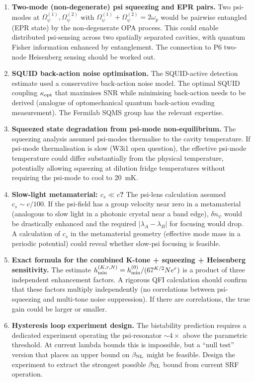 \documentclass[11pt,twocolumn]{article}
\newcommand{\lam}{\lambda}
\newcommand{\Opsi}{\Omega_\psi}
\begin{document}
\begin{enumerate}

\item \textbf{Two-mode (non-degenerate) psi squeezing and EPR pairs.}
Two psi-modes at $\Opsi^{(1)}, \Opsi^{(2)}$ with $\Opsi^{(1)} +
\Opsi^{(2)} = 2\omega_p$ would be pairwise entangled (EPR state)
by the non-degenerate OPA process. This could enable distributed
psi-sensing across two spatially separated cavities, with quantum
Fisher information enhanced by entanglement. The connection to P6
two-node Heisenberg sensing should be worked out.

\item \textbf{SQUID back-action noise optimisation.}
The SQUID-active detection estimate used a conservative back-action
noise model. The optimal SQUID coupling $\kappa_{\rm opt}$ that
maximises SNR while minimising back-action needs to be derived
(analogue of optomechanical quantum back-action evading measurement).
The Fermilab SQMS group has the relevant expertise.

\item \textbf{Squeezed state degradation from psi-mode non-equilibrium.}
The squeezing analysis assumed psi-modes thermalise to the cavity
temperature. If psi-mode thermalisation is slow (W3i1 open question),
the effective psi-mode temperature could differ substantially from
the physical temperature, potentially allowing squeezing at
dilution fridge temperatures without requiring the psi-mode to cool
to 20~mK.

\item \textbf{Slow-light metamaterial: $c_s \ll c$?}
The psi-lens calculation assumed $c_s \sim c/100$. If the psi-field
has a group velocity near zero in a metamaterial (analogous to slow
light in a photonic crystal near a band edge), $\delta n_\psi$ would
be drastically enhanced and the required $|\lam_A - \lam_B|$ for
focusing would drop. A calculation of $c_s$ in the metamaterial
geometry (effective mode mass in a periodic potential) could reveal
whether slow-psi focusing is feasible.

\item \textbf{Exact formula for the combined K-tone + squeezing + Heisenberg sensitivity.}
The estimate $h_{\rm min}^{(K,r,N)} = h_{\rm min}^{(0)} / (67^{K/2} N e^r)$
is a product of three independent enhancement factors. A rigorous
QFI calculation should confirm that these factors multiply
independently (no correlations between psi-squeezing and
multi-tone noise suppression). If there are correlations, the true
gain could be larger or smaller.

\item \textbf{Hysteresis loop experiment design.}
The bistability prediction requires a dedicated experiment operating
the psi-resonator $\sim 4\times$ above the parametric threshold.
At current lambda bounds this is impossible, but a ``null test''
version that places an upper bound on $\beta_{\rm NL}$ might be
feasible. Design the experiment to extract the strongest possible
$\beta_{\rm NL}$ bound from current SRF operation.

\end{enumerate}
\end{document}
